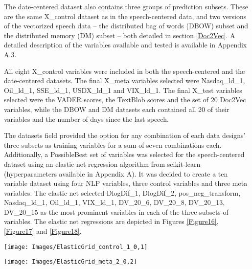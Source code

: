\documentclass[11pt,preprint, authoryear]{elsarticle}
\let\origfigure\figure
\let\endorigfigure\endfigure
\renewenvironment{figure}[1][2] {
    \expandafter\origfigure\expandafter[H]
} {
    \endorigfigure
}
\numberwithin{equation}{section}
\numberwithin{figure}{section}
\numberwithin{table}{section}
\begin{document}
The date-centered dataset also contains three groups of prediction
subsets. These are the same X\_control dataset as in the speech-centered
data, and two versions of the vectorized speech data -- the distributed
bag of words (DBOW) subset and the distributed memory (DM) subset --
both detailed in section \ref{Doc2Vec}. A detailed description of the
variables available and tested is available in Appendix A.3.

All eight X\_control variables were included in both the speech-centered
and the date-centered datasets. The final X\_meta variables selected
were Nasdaq\_ld\_1, Oil\_ld\_1, SSE\_ld\_1, USDX\_ld\_1 and VIX\_ld\_1.
The final X\_test variables selected were the VADER scores, the TextBlob
scores and the set of 20 Doc2Vec variables, while the DBOW and DM
datasets each contained all 20 of their variables and the number of days
since the last speech.

The datasets field provided the option for any combination of each data
designs' three subsets as training variables for a sum of seven
combinations each. Additionally, a PossibleBest set of variables was
selected for the speech-centered dataset using an elastic net regression
algorithm from scikit-learn (hyperparameters available in Appendix A).
It was decided to create a ten variable dataset using four NLP
variables, three control variables and three meta variables. The elastic
net selected DlogDif\_1, DlogDif\_2, pos\_neg\_transform, Nasdaq\_ld\_1,
Oil\_ld\_1, VIX\_ld\_1, DV\_20\_6, DV\_20\_8, DV\_20\_13, DV\_20\_15 as
the most prominent variables in each of the three subsets of variables.
The elastic net regressions are depicted in Figures \ref{Figure16},
\ref{Figure17} and \ref{Figure18}.

\begin{figure}[H]

{\centering \texttt{[image: Images/ElasticGrid\_control\_1\_0,1]}

}

\caption{Elastic net: control set \label{Figure16}}\label{fig:Elastic net: test set}
\end{figure}

\begin{figure}[H]

{\centering \texttt{[image: Images/ElasticGrid\_meta\_2\_0,2]}

}

\caption{Elastic net: meta set \label{Figure17}}\label{fig:Elastic net: meta set}
\end{figure}
\end{document}
